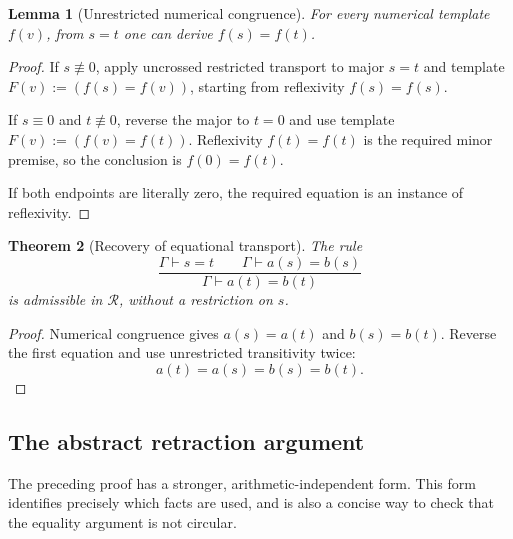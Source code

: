 \documentclass[11pt,letterpaper]{article}
\newtheorem{theorem}{Theorem}[section]
\newtheorem{lemma}[theorem]{Lemma}
\theoremstyle{definition}\newtheorem{definition}[theorem]{Definition}
\theoremstyle{remark}\newtheorem{remark}[theorem]{Remark}
\begin{document}
\begin{lemma}[Unrestricted numerical congruence]\label{rev:congr}
For every numerical template $f(v)$, from $s=t$ one can derive
$f(s)=f(t)$.
\end{lemma}
\begin{proof}
If $s\not\equiv0$, apply uncrossed restricted transport to major $s=t$
and template $F(v):=(f(s)=f(v))$, starting from reflexivity
$f(s)=f(s)$.

If $s\equiv0$ and $t\not\equiv0$, reverse the major to $t=0$ and use
template $F(v):=(f(v)=f(t))$. Reflexivity $f(t)=f(t)$ is the required
minor premise, so the conclusion is $f(0)=f(t)$.

If both endpoints are literally zero, the required equation is an
instance of reflexivity.
\end{proof}

\begin{theorem}[Recovery of equational transport]\label{rev:tr-eq}
The rule
\[
 \frac{\Gamma\vdash s=t\qquad\Gamma\vdash a(s)=b(s)}
      {\Gamma\vdash a(t)=b(t)}
\]
is admissible in $\mathcal R$, without a restriction on $s$.
\end{theorem}
\begin{proof}
Numerical congruence gives $a(s)=a(t)$ and $b(s)=b(t)$. Reverse the
first equation and use unrestricted transitivity twice:
\[
                         a(t)=a(s)=b(s)=b(t).
\]
\end{proof}

\subsection{The abstract retraction argument}

The preceding proof has a stronger, arithmetic-independent form. This
form identifies precisely which facts are used, and is also a concise
way to check that the equality argument is not circular.
\end{document}
